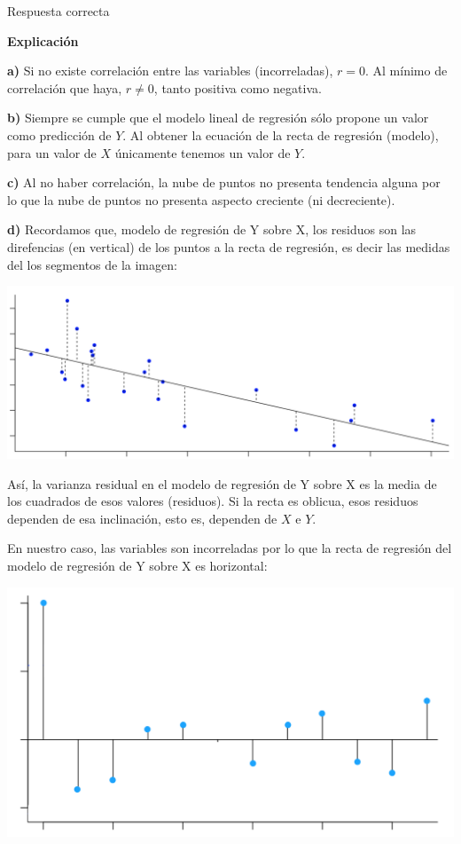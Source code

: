\documentclass[
]{book}
\begin{document}
Respuesta correcta

\textbf{Explicación}

\textbf{a)} Si no existe correlación entre las variables (incorreladas), \(r=0\). Al mínimo de correlación que haya, \(r \neq 0\), tanto positiva como negativa.

\textbf{b)} Siempre se cumple que el modelo lineal de regresión sólo propone un valor como predicción de \(Y\). Al obtener la ecuación de la recta de regresión (modelo), para un valor de \(X\) únicamente tenemos un valor de \(Y\).

\textbf{c)} Al no haber correlación, la nube de puntos no presenta tendencia alguna por lo que la nube de puntos no presenta aspecto creciente (ni decreciente).

\textbf{d)} Recordamos que, modelo de regresión de Y sobre X, los residuos son las direfencias (en vertical) de los puntos a la recta de regresión, es decir las medidas del los segmentos de la imagen:

\includegraphics[width=23.72in]{img/4_2}

Así, la varianza residual en el modelo de regresión de Y sobre X es la media de los cuadrados de esos valores (residuos). Si la recta es oblicua, esos residuos dependen de esa inclinación, esto es, dependen de \(X\) e \(Y\).

En nuestro caso, las variables son incorreladas por lo que la recta de regresión del modelo de regresión de Y sobre X es horizontal:

\includegraphics[width=15.42in]{img/4_3}
\end{document}
